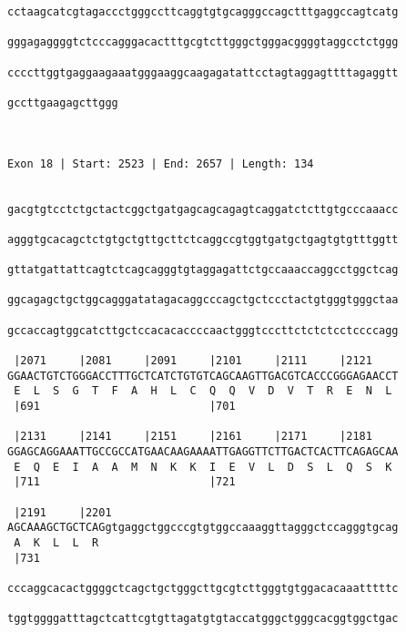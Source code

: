 \documentclass{article}
\begin{document}
\begin{Verbatim}
cctaagcatcgtagaccctgggccttcaggtgtgcagggccagctttgaggccagtcatg
                                                            
gggagaggggtctcccagggacactttgcgtcttgggctgggacggggtaggcctctggg
                                                            
ccccttggtgaggaagaaatgggaaggcaagagatattcctagtaggagttttagaggtt
                                                            
gccttgaagagcttggg
                 
                 
 
Exon 18 | Start: 2523 | End: 2657 | Length: 134


gacgtgtcctctgctactcggctgatgagcagcagagtcaggatctcttgtgcccaaacc
                                                            
agggtgcacagctctgtgctgttgcttctcaggccgtggtgatgctgagtgtgtttggtt
                                                            
gttatgattattcagtctcagcagggtgtaggagattctgccaaaccaggcctggctcag
                                                            
ggcagagctgctggcagggatatagacaggcccagctgctccctactgtgggtgggctaa
                                                            
gccaccagtggcatcttgctccacacaccccaactgggtcccttctctctcctccccagg
                                                            
 |2071     |2081     |2091     |2101     |2111     |2121    
GGAACTGTCTGGGACCTTTGCTCATCTGTGTCAGCAAGTTGACGTCACCCGGGAGAACCT
 E  L  S  G  T  F  A  H  L  C  Q  Q  V  D  V  T  R  E  N  L 
 |691                          |701                         
  
 |2131     |2141     |2151     |2161     |2171     |2181    
GGAGCAGGAAATTGCCGCCATGAACAAGAAAATTGAGGTTCTTGACTCACTTCAGAGCAA
 E  Q  E  I  A  A  M  N  K  K  I  E  V  L  D  S  L  Q  S  K 
 |711                          |721                         
  
 |2191     |2201                                            
AGCAAAGCTGCTCAGgtgaggctggcccgtgtggccaaaggttagggctccagggtgcag
 A  K  L  L  R                                              
 |731                                                       
  
cccaggcacactggggctcagctgctgggcttgcgtcttgggtgtggacacaaatttttc
                                                            
tggtggggatttagctcattcgtgttagatgtgtaccatgggctgggcacggtggctgac
                                                            

\end{Verbatim}
\end{document}
